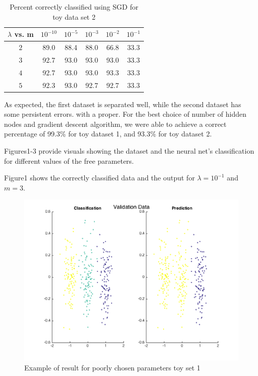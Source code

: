 \documentclass[12pt, twocolumn]{article}
\begin{document}
\begin{center}
\begin{table}
  \begin{tabular}{ | c | c | c | c | c | c | }
    \hline
     $\lambda$ vs. m & $10^{-10}$ & $10^{-5}$ & $10^{-3}$ & $10^{-2}$ & $10^{-1}$ \\ \hline
     $2$ & 89.0 & 88.4 & 88.0 & 66.8 & 33.3 \\ \hline
     $3$ & 92.7 & 93.0 & 93.0 & 93.0 & 33.3 \\ \hline
     $4$ & 92.7 & 93.0 & 93.0 & 93.3 & 33.3 \\ \hline
     $5$ & 92.3 & 93.0 & 92.7 & 92.7 & 33.3 \\
    \hline
  \end{tabular}
  \caption{Percent correctly classified using SGD for toy data set 2}
  \end{table}
\end{center}

As expected, the first dataset is separated well, while the second dataset has some persistent errors. with a proper. For the best choice of number of hidden nodes and gradient descent algorithm, we were able to achieve a correct percentage of 99.3\% for toy dataset 1, and 93.3\% for toy dataset 2.

Figures1-3 provide visuals showing the dataset and the neural net's classification for different values of the free parameters.

Figure1 shows the correctly classified data and the output for $\lambda=10^{-1}$ and $m=3$.

\begin{figure}
\includegraphics[scale=.4]{toy1val_lambda_min1_m_3.png}
\caption{ Example of result for poorly chosen parameters toy set 1}
\end{figure}
\end{document}
